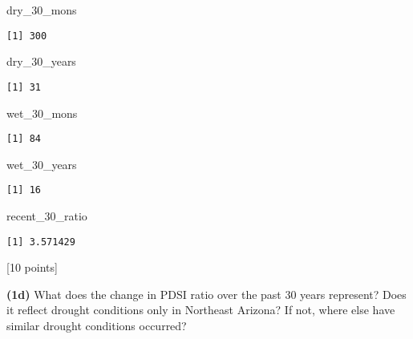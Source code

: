 \documentclass[
  letterpaper,
  DIV=11,
  numbers=noendperiod]{scrartcl}
\newenvironment{Shaded}{\begin{snugshade}}{\end{snugshade}}
\newcommand{\NormalTok}[1]{\textcolor[rgb]{0.00,0.23,0.31}{#1}}
\begin{document}
\begin{Shaded}
\begin{Highlighting}[]
\NormalTok{dry\_30\_mons}
\end{Highlighting}
\end{Shaded}

\begin{verbatim}
[1] 300
\end{verbatim}

\begin{Shaded}
\begin{Highlighting}[]
\NormalTok{dry\_30\_years}
\end{Highlighting}
\end{Shaded}

\begin{verbatim}
[1] 31
\end{verbatim}

\begin{Shaded}
\begin{Highlighting}[]
\NormalTok{wet\_30\_mons}
\end{Highlighting}
\end{Shaded}

\begin{verbatim}
[1] 84
\end{verbatim}

\begin{Shaded}
\begin{Highlighting}[]
\NormalTok{wet\_30\_years}
\end{Highlighting}
\end{Shaded}

\begin{verbatim}
[1] 16
\end{verbatim}

\begin{Shaded}
\begin{Highlighting}[]
\NormalTok{recent\_30\_ratio}
\end{Highlighting}
\end{Shaded}

\begin{verbatim}
[1] 3.571429
\end{verbatim}

{[}10 points{]}

\textbf{(1d)} What does the change in PDSI ratio over the past 30 years
represent? Does it reflect drought conditions only in Northeast Arizona?
If not, where else have similar drought conditions occurred?
\end{document}
